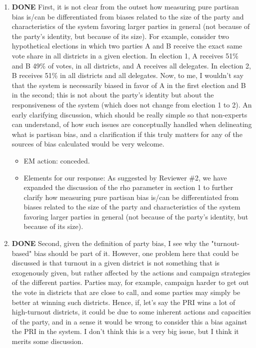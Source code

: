 \documentclass{article}
\begin{document}
\begin{enumerate}
\item {\bfseries\sffamily DONE} First, it is not clear from the outset how measuring pure partisan bias is/can be differentiated from biases related to the size of the party and characteristics of the system favoring larger parties in general (not because of the party's identity, but because of its size). For example, consider two hypothetical elections in which two parties A and B receive the exact same vote share in all districts in a given election. In election 1, A receives 51\% and B 49\% of votes, in all districts, and A receives all delegates. In election 2, B receives 51\% in all districts and all delegates. Now, to me, I wouldn't say that the system is necessarily biased in favor of  A in the first election and B in the second; this is not about the party's identity but about the responsiveness of the system (which does not change from election 1 to 2). An early clarifying discussion, which should be really simple so that non-experts can understand, of how such issues are conceptually handled when delineating what is partisan bias, and a clarification if this truly matters for any of the sources of bias calculated would be very welcome.
\label{sec:orgheadline9}
\begin{itemize}
\item EM action: conceded.
\item Elements for our response: As suggested by Reviewer \#2, we have expanded the discussion of the rho parameter in section 1 to further clarify  how measuring pure partisan bias is/can be differentiated from biases related to the size of the party and characteristics of the system favoring larger parties in general (not because of the party's identity, but because of its size).
\end{itemize}
\item {\bfseries\sffamily DONE} Second, given the definition of party bias, I see why the "turnout-based" bias should be part of it. However, one problem here that could be discussed is that turnout in a given district is not something that is exogenously given, but rather affected by the actions and campaign strategies of the different parties. Parties may, for example, campaign harder to get out the vote in districts that are close to call, and some parties may simply be better at winning such districts. Hence, if, let's say the PRI wins a lot of high-turnout districts, it could be due to some inherent actions and capacities of the party, and in a sense it would be wrong to consider this a bias against the PRI in the system. I don't think this is a very big issue, but I think it merits some discussion.

\end{enumerate}
\end{document}
